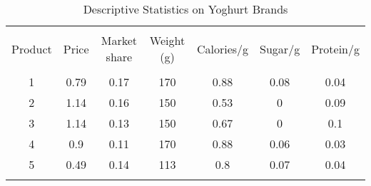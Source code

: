 

\begin{table}[!htbp] \centering 
  \caption{Descriptive Statistics on Yoghurt Brands} 
  \label{tab:question1} 
\begin{tabular}{@{\extracolsep{5pt}} ccccccc} 
\\[-1.8ex]\hline 
\hline \\[-1.8ex] 
Product & Price & Market share & Weight (g) & Calories/g & Sugar/g & Protein/g \\ 
\hline \\[-1.8ex] 
1 & 0.79 & 0.17 & 170 & 0.88 & 0.08 & 0.04 \\ 
2 & 1.14 & 0.16 & 150 & 0.53 & 0 & 0.09 \\ 
3 & 1.14 & 0.13 & 150 & 0.67 & 0 & 0.1 \\ 
4 & 0.9 & 0.11 & 170 & 0.88 & 0.06 & 0.03 \\ 
5 & 0.49 & 0.14 & 113 & 0.8 & 0.07 & 0.04 \\ 
\hline \\[-1.8ex] 
\end{tabular} 
\end{table} 



